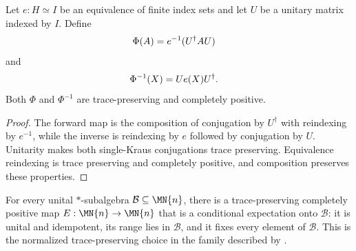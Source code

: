 \begin{theorem}
    \label{thm:unitary_reindex_channels}
    \leanok
    Let $e:H\simeq I$ be an equivalence of finite index sets and let
    $U$ be a unitary matrix indexed by $I$. Define
    \begin{align}
        \Phi(A)&=e^{-1}(U^\dagger A U)
        \notag
    \end{align}
    and
    \begin{align}
        \Phi^{-1}(X)&=Ue(X)U^\dagger.
        \notag
    \end{align}
    Both $\Phi$ and $\Phi^{-1}$ are trace-preserving and completely positive.
\end{theorem}

\begin{proof}\leanok
    The forward map is the composition of conjugation by $U^\dagger$ with
    reindexing by $e^{-1}$, while the inverse is reindexing by $e$ followed
    by conjugation by $U$. Unitarity makes both single-Kraus conjugations
    trace preserving. Equivalence reindexing is trace preserving and
    completely positive, and composition preserves these properties.
\end{proof}

\begin{theorem}
    \label{thm:matrix_star_subalgebra_cptp_conditional_expectation}
    \leanok
    For every unital $*$-subalgebra $\mathcal B\subseteq\MN{n}$, there is a
    trace-preserving completely positive map $E:\MN{n}\to\MN{n}$ that is
    a conditional expectation onto $\mathcal B$: it is unital and
    idempotent, its range lies in $\mathcal B$, and it fixes every element
    of $\mathcal B$. This is the normalized trace-preserving choice in the
    family described by
    \cite[Proposition~1.5 and Equation~(1.40)]{Wolf2012Quantum}.
\end{theorem}

